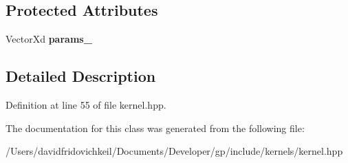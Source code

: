 \subsection*{Protected Attributes}
\begin{DoxyCompactItemize}
\item 
\hypertarget{classgp_1_1_kernel_af79e9cbee5be105a6e9393e2f6fba5db}{}\label{classgp_1_1_kernel_af79e9cbee5be105a6e9393e2f6fba5db} 
Vector\+Xd {\bfseries params\+\_\+}
\end{DoxyCompactItemize}


\subsection{Detailed Description}


Definition at line 55 of file kernel.\+hpp.



The documentation for this class was generated from the following file\+:\begin{DoxyCompactItemize}
\item 
/\+Users/davidfridovichkeil/\+Documents/\+Developer/gp/include/kernels/kernel.\+hpp\end{DoxyCompactItemize}

